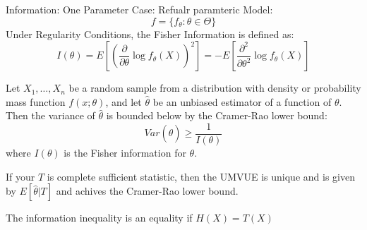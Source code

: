 \documentclass[answers,12pt,addpoints]{exam}
\begin{document}
\begin{example}
    
\end{example}

\begin{remark}
    Information: One Parameter Case:
    Refualr paramteric Model:
    $$f = \{f_\theta : \theta \in \Theta\}$$
    Under Regularity Conditions, the Fisher Information is defined as:
    $$I(\theta) = E\left[\left(\frac{\partial}{\partial \theta} \log f_\theta(X)\right)^2\right] = -E\left[\frac{\partial^2}{\partial \theta^2} \log f_\theta(X)\right]$$
\end{remark}

\begin{theorem}
     Let $X_1, \ldots, X_n$ be a random sample from a distribution with density or probability mass function $f(x; \theta)$, and let $\hat{\theta}$ be an unbiased estimator of a function of $\theta$. Then the variance of $\hat{\theta}$ is bounded below by the Cramer-Rao lower bound:
    $$Var(\hat{\theta}) \geq \frac{1}{I(\theta)}$$
    where $I(\theta)$ is the Fisher information for $\theta$.
\end{theorem}

\begin{remark}
    If your $T$ is complete sufficient statistic, then the UMVUE is unique and is given by $E[\hat{\theta} | T]$ and achives the Cramer-Rao lower bound.
\end{remark}

\begin{theorem}
    [5.1] The information inequality is an equality if $H(X) = T(X)$ 
\end{theorem}
\end{document}
